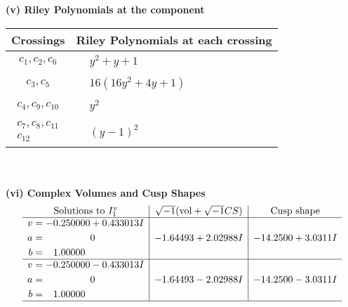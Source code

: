 \documentclass[1p]{elsarticle_modified}
\theoremstyle{definition}
\newcommand{\I}{\sqrt{-1}}
\begin{document}
\newpage\renewcommand{\arraystretch}{1}
\flushleft \textbf{(v) Riley Polynomials at the component}\newline \\
\begin{tabular}{m{50pt}|m{274pt}}
Crossings & \hspace{64pt}Riley Polynomials at each crossing \\
\hline $$\begin{aligned}c_{1},c_{2},c_{6}\end{aligned}$$&$\begin{aligned}
&y^2+y+1
\end{aligned}$\\
\hline $$\begin{aligned}c_{3},c_{5}\end{aligned}$$&$\begin{aligned}
&16(16 y^2+4 y+1)
\end{aligned}$\\
\hline $$\begin{aligned}c_{4},c_{9},c_{10}\end{aligned}$$&$\begin{aligned}
&y^2
\end{aligned}$\\
\hline $$\begin{aligned}c_{7},c_{8},c_{11}\\c_{12}\end{aligned}$$&$\begin{aligned}
&(y-1)^2
\end{aligned}$\\
\hline
\end{tabular}\\~\\
\newpage\flushleft \textbf{(vi) Complex Volumes and Cusp Shapes}
$$\begin{array}{c|c|c}  
\text{Solutions to }I^v_{1}& \I (\text{vol} + \sqrt{-1}CS) & \text{Cusp shape}\\
 \hline 
\begin{aligned}
v &= -0.250000 + 0.433013 I \\
a &= \phantom{-0.000000 } 0 \\
b &= \phantom{-}1.00000\phantom{ +0.000000I}\end{aligned}
 & -1.64493 + 2.02988 I & -14.2500 + 3.0311 I \\ \hline\begin{aligned}
v &= -0.250000 - 0.433013 I \\
a &= \phantom{-0.000000 } 0 \\
b &= \phantom{-}1.00000\phantom{ +0.000000I}\end{aligned}
 & -1.64493 - 2.02988 I & -14.2500 - 3.0311 I\\
 \hline 
 \end{array}$$\newpage
\end{document}
